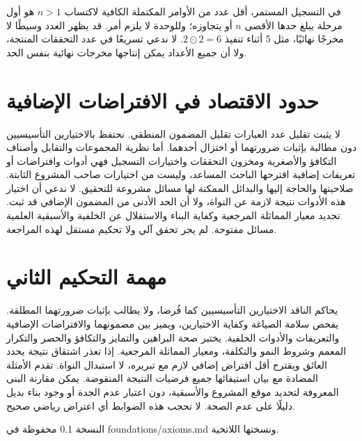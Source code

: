 \documentclass[12pt,a4paper]{article}
\begin{document}
في التسجيل المستمر، أقل عدد من الأوامر المكتملة الكافية لاكتساب $n>1$ هو أول مرحلة يبلغ حدها الأقصى $n$ أو يتجاوزه؛ وللوحدة لا يلزم أمر. قد يظهر العدد وسيطًا لا مخرجًا نهائيًا، مثل 5 أثناء تنفيذ $2\odot2=6$. لا ندعي تسريعًا في عدد التحققات المنتجة، ولا أن جميع الأعداد يمكن إنتاجها مخرجات نهائية بنفس الحد.

\section{حدود الاقتصاد في الافتراضات الإضافية}
لا يثبت تقليل عدد العبارات تقليل المضمون المنطقي. نحتفظ بالاختيارين التأسيسيين دون مطالبة بإثبات ضرورتهما أو اختزال أحدهما. أما نظرية المجموعات والتقابل وأصناف التكافؤ والأصغرية ومخزون التحققات واختيارات التسجيل فهي أدوات وافتراضات أو تعريفات إضافية اقترحها الباحث المساعد، وليست من اختيارات صاحب المشروع الثابتة. صلاحيتها والحاجة إليها والبدائل الممكنة لها مسائل مشروعة للتحقيق. لا ندعي أن اختيار هذه الأدوات نتيجة لازمة عن النواة، ولا أن الحد الأدنى من المضمون الإضافي قد ثبت. تحديد معيار المماثلة المرجعية وكفاية البناء والاستقلال عن الخلفية والأسبقية العلمية مسائل مفتوحة. لم يجر تحقق آلي ولا تحكيم مستقل لهذه المراجعة.

\section{مهمة التحكيم الثاني}
يحاكم الناقد الاختيارين التأسيسيين كما فُرضا، ولا يطالب بإثبات ضرورتهما المطلقة. يفحص سلامة الصياغة وكفاية الاختيارين، ويميز بين مضمونهما والافتراضات الإضافية والتعريفات والأدوات الخلفية. يختبر صحة البراهين والتمايز والتكافؤ والحصر والتكرار المعمم وشروط النمو والتكلفة، ومعيار المماثلة المرجعية. إذا تعذر اشتقاق نتيجة يحدد العائق ويقترح أقل افتراض إضافي لازم مع تبريره، لا استبدال النواة. تقدم الأمثلة المضادة مع بيان استيفائها جميع فرضيات النتيجة المنقوضة. يمكن مقارنة البنى المعروفة لتحديد موقع المشروع والأسبقية، دون اعتبار عدم الجدة أو وجود بناء بديل دليلًا على عدم الصحة. لا تحجب هذه الضوابط أي اعتراض رياضي صحيح.

النسخة 0.1 محفوظة في \textenglish{foundations/axioms.md} ونسختها اللاتخية.
\end{document}
